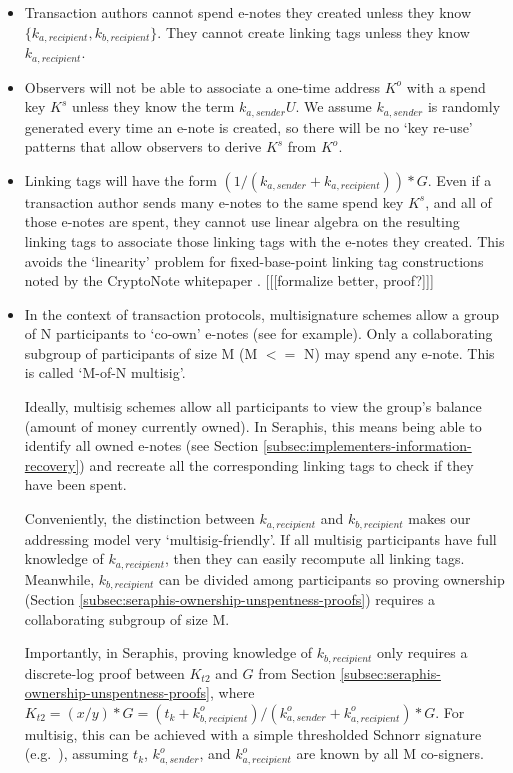 \begin{itemize}
    \item Transaction authors cannot spend e-notes they created unless they know $\{k_{a, recipient}, k_{b, recipient}\}$. They cannot create linking tags unless they know $k_{a, recipient}$.

    \item Observers will not be able to associate a one-time address $K^o$ with a spend key $K^s$ unless they know the term $k_{a,sender} U$. We assume $k_{a,sender}$ is randomly generated every time an e-note is created, so there will be no `key re-use' patterns that allow observers to derive $K^s$ from $K^o$.

    \item Linking tags will have the form $(1/(k_{a, sender} + k_{a, recipient}))*G$. Even if a transaction author sends many e-notes to the same spend key $K^s$, and all of those e-notes are spent, they cannot use linear algebra on the resulting linking tags to associate those linking tags with the e-notes they created. This avoids the `linearity' problem for fixed-base-point linking tag constructions noted by the CryptoNote whitepaper \cite{cryptoNoteWhitePaper}. [[[formalize better, proof?]]]

    \item In the context of transaction protocols, multisignature schemes allow a group of N participants to `co-own' e-notes (see \cite{MRL-0009-multisig} for example). Only a collaborating subgroup of participants of size M (M $<=$ N) may spend any e-note. This is called `M-of-N multisig'.

    Ideally, multisig schemes allow all participants to view the group's balance (amount of money currently owned). In Seraphis, this means being able to identify all owned e-notes (see Section \ref{subsec:implementers-information-recovery}) and recreate all the corresponding linking tags to check if they have been spent.

    Conveniently, the distinction between $k_{a, recipient}$ and $k_{b, recipient}$ makes our addressing model very `multisig-friendly'. If all multisig participants have full knowledge of $k_{a, recipient}$, then they can easily recompute all linking tags. Meanwhile, $k_{b, recipient}$ can be divided among participants so proving ownership (Section \ref{subsec:seraphis-ownership-unspentness-proofs}) requires a collaborating subgroup of size M.

    Importantly, in Seraphis, proving knowledge of $k_{b, recipient}$ only requires a discrete-log proof between $K_{t2}$ and $G$ from Section \ref{subsec:seraphis-ownership-unspentness-proofs}, where $K_{t2} = (x/y)*G = (t_k + k^o_{b, recipient})/(k^o_{a, sender} + k^o_{a, recipient})*G$. For multisig, this can be achieved with a simple thresholded Schnorr signature (e.g.\ \cite{...}), assuming $t_k$, $k^o_{a, sender}$, and $k^o_{a, recipient}$ are known by all M co-signers.
\end{itemize}



